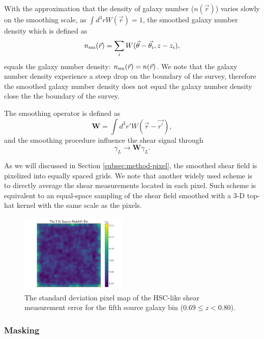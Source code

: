 \documentclass[twocolumn]{aastex62}
\begin{document}
With the approximation that the density of galaxy number ($n(\vec{r})$) varies slowly on the smoothing scale,
as $\int d^3r W(\vec{r})=1$, the smoothed galaxy number density which is defined as
\begin{equation}\label{eq-numDesSmooth}
n_{\rm{sm}}(\vec{r})=\sum_i W(\vec{\theta}-\vec{\theta_i},z-z_i),
\end{equation}
equals the galaxy number density: $n_{\rm{sm}}(\vec{r})=n(\vec{r})$.
We note that the galaxy number density experience a steep drop on the boundary of the survey, therefore the
smoothed galaxy number density does not equal the galaxy number density close the the boundary of the survey.

The smoothing operator is defined as
\begin{equation}
\mathbf{W} = \int d^3 r' W(\vec{r}-\vec{r'}),
\end{equation}
and the smoothing procedure influence the shear signal through
\begin{equation}
\gamma_L \rightarrow \mathbf{W} \gamma_L.
\end{equation}

As we will discussed in Section \ref{subsec:method-pixel}, the smoothed shear field is pixelized into equally spaced
grids. We note that another widely used scheme is to directly average the shear measurements located in each pixel.
Such scheme is equivalent to an equal-space sampling of the shear field smoothed with a $3$-D top-hat kernel with the
same scale as the pixels.

\begin{figure}[!t]
 \centering
 \includegraphics[width=0.45\textwidth]{noise_std_map_pix.pdf}
 \caption{The standard deviation pixel map of the HSC-like shear measurement error for the fifth source galaxy bin 
        ($0.69 \leq z < 0.80 $).}
\end{figure}

\subsubsection{Masking}
\label{subsec:method-msknoise}
\end{document}
